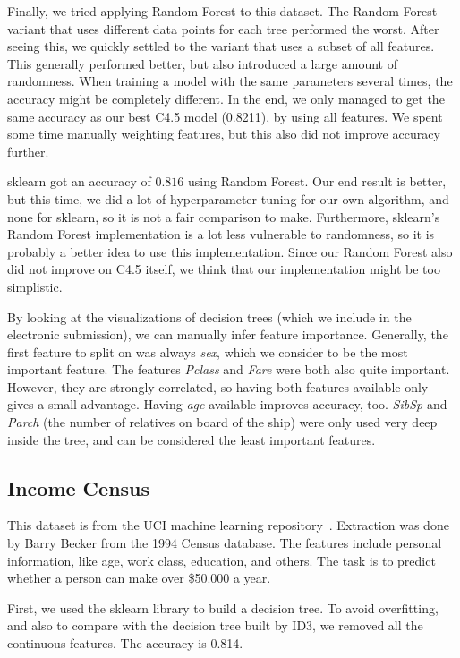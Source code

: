 \documentclass[a4paper]{article}
\begin{document}
Finally, we tried applying Random Forest to this dataset. The Random Forest variant that uses different data points for each tree performed the worst. After seeing this, we quickly settled to the variant that uses a subset of all features. This generally performed better, but also introduced a large amount of randomness. When training a model with the same parameters several times, the accuracy might be completely different. In the end, we only managed to get the same accuracy as our best C4.5 model (0.8211), by using all features.  We spent some time manually weighting features, but this also did not improve accuracy further.

sklearn got an accuracy of $0.816$ using Random Forest. Our end result is better, but this time, we did a lot of hyperparameter tuning for our own algorithm, and none for sklearn, so it is not a fair comparison to make. Furthermore, sklearn's Random Forest implementation is a lot less vulnerable to randomness, so it is probably a better idea to use this implementation. Since our Random Forest also did not improve on C4.5 itself, we think that our implementation might be too simplistic.

By looking at the visualizations of decision trees (which we include in the electronic submission), we can manually infer feature importance. Generally, the first feature to split on was always \emph{sex}, which we consider to be the most important feature. The features \emph{Pclass} and \emph{Fare} were both also quite important. However, they are strongly correlated, so having both features available only gives a small advantage. Having \emph{age} available improves accuracy, too. \emph{SibSp} and \emph{Parch} (the number of relatives on board of the ship) were only used very deep inside the tree, and can be considered the least important features.

\subsection{Income Census}

This dataset is from the UCI machine learning repository~\cite{census}. Extraction was done by Barry Becker from the 1994 Census database. The features include personal information, like age, work class, education, and others. The task is to predict whether a person can make over \$50.000 a year.

First, we used the sklearn library to build a decision tree. To avoid overfitting, and also to compare with the decision tree built by ID3, we removed all the continuous features. The accuracy is 0.814.
\end{document}
